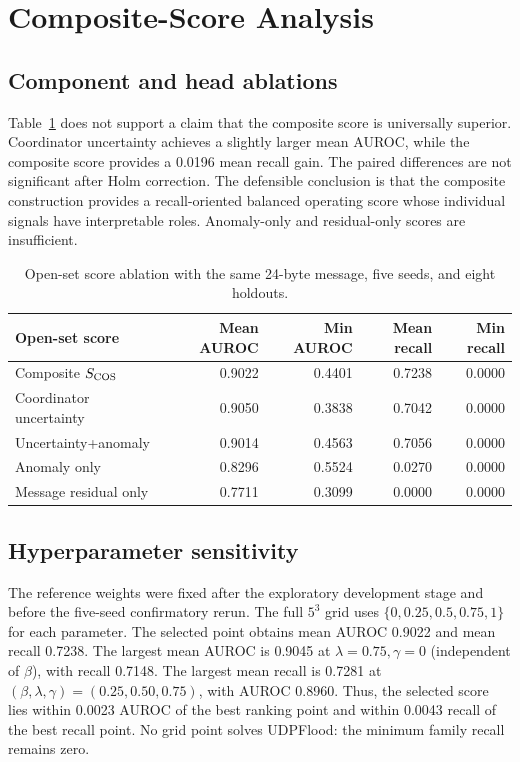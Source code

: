 \section{Composite-Score Analysis}

\subsection{Component and head ablations}

Table~\ref{tab:scoreablation} does not support a claim that the composite score is universally superior. Coordinator uncertainty achieves a slightly larger mean AUROC, while the composite score provides a 0.0196 mean recall gain. The paired differences are not significant after Holm correction. The defensible conclusion is that the composite construction provides a recall-oriented balanced operating score whose individual signals have interpretable roles. Anomaly-only and residual-only scores are insufficient.

\begin{table}[H]
\caption{Open-set score ablation with the same 24-byte message, five seeds, and eight holdouts.}
\label{tab:scoreablation}
\centering
\begin{tabular}{lrrrr}
\toprule
Open-set score & Mean AUROC & Min AUROC & Mean recall & Min recall \\
\midrule
Composite $S_{\rm COS}$ & 0.9022 & 0.4401 & 0.7238 & 0.0000 \\
Coordinator uncertainty & 0.9050 & 0.3838 & 0.7042 & 0.0000 \\
Uncertainty+anomaly & 0.9014 & 0.4563 & 0.7056 & 0.0000 \\
Anomaly only & 0.8296 & 0.5524 & 0.0270 & 0.0000 \\
Message residual only & 0.7711 & 0.3099 & 0.0000 & 0.0000 \\
\bottomrule
\end{tabular}
\end{table}

\subsection{Hyperparameter sensitivity}

The reference weights were fixed after the exploratory development stage and before the five-seed confirmatory rerun. The full $5^3$ grid uses $\{0,0.25,0.5,0.75,1\}$ for each parameter. The selected point obtains mean AUROC 0.9022 and mean recall 0.7238. The largest mean AUROC is 0.9045 at $\lambda=0.75,\gamma=0$ (independent of $\beta$), with recall 0.7148. The largest mean recall is 0.7281 at $(\beta,\lambda,\gamma)=(0.25,0.50,0.75)$, with AUROC 0.8960. Thus, the selected score lies within 0.0023 AUROC of the best ranking point and within 0.0043 recall of the best recall point. No grid point solves UDPFlood: the minimum family recall remains zero.

